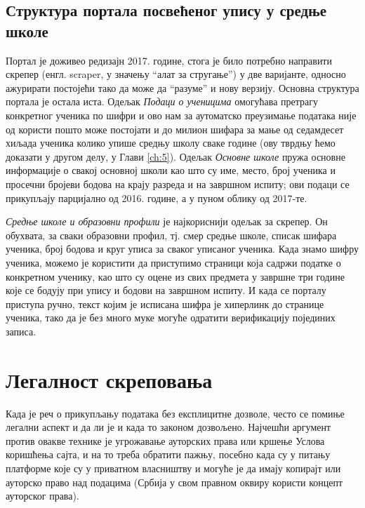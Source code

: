 \subsection{Структура портала посвећеног упису у средње школе}

Портал је доживео редизајн 2017. године, стога је било потребно направити скрепер (енгл. scraper, у значењу \enquote{алат за стругање}) у две варијанте, односно ажурирати постојећи тако да може да \enquote{разуме} и нову верзију. Основна структура портала је остала иста. Одељак \textit{Подаци о ученицима} омогућава претрагу конкретног ученика по шифри и ово нам за аутоматско преузимање података није од користи пошто може постојати и до милион шифара за мање од седамдесет хиљада ученика колико упише средњу школу сваке године (ову тврдњу ћемо доказати у другом делу, у Глави \ref{ch:5}). Одељак \textit{Основне школе} пружа основне информације о свакој основној школи као што су име, место, број ученика и просечни бројеви бодова на крају разреда и на завршном испиту; ови подаци се прикупљају парцијално од 2016. године, а у пуном облику од 2017-те. 

\textit{Средње школе и образовни профили} је најкориснији одељак за скрепер. Он обухвата, за сваки образовни профил, тј. смер средње школе, списак шифара ученика, број бодова и круг уписа за сваког уписаног ученика. Када знамо шифру ученика, можемо је користити да приступимо страници која садржи податке о конкретном ученику, као што су оцене из свих предмета у завршне три године које се бодују при упису и бодови на завршном испиту. И када се порталу приступа ручно, текст којим је исписана шифра је хиперлинк до странице ученика, тако да је без много муке могуће одратити верификацију појединих записа.

\section{Легалност скреповања}

Када је реч о прикупљању података без експлицитне дозволе, често се помиње легални аспект и да ли је и када то законом дозвољено. Најчешћи аргумент против овакве технике је угрожавање ауторских права или кршење Услова коришћења сајта, и на то треба обратити пажњу, посебно када су у питању платформе које су у приватном власништву и могуће је да имају копирајт или ауторско право над подацима (Србија у свом правном оквиру користи концепт ауторског права). 

